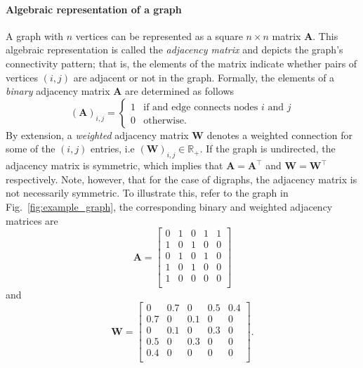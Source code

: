 \paragraph*{Algebraic representation of a graph}
A graph with $n$ vertices can be represented as a square $n\times n$ matrix $\bm{A}$. This algebraic representation is called the \emph{adjacency matrix} and depicts the graph's connectivity pattern; that is, the elements of the matrix indicate whether pairs of vertices $\left(i,j\right)$ are adjacent or not in the graph. Formally,
the elements of a \emph{binary} adjacency matrix $\bm{A}$ are determined as follows
\begin{equation}
	\left(\bm{A}\right)_{i,j} =
	\begin{cases}
		1 & \text{if and edge connects nodes $i$ and $j$}\\
		0 & \text{otherwise}.
	\end{cases}
\end{equation}
By extension, a \emph{weighted} adjacency matrix $\bm{W}$ denotes a weighted connection for some of the $\left(i,j\right)$ entries, i.e $\left(\bm{W}\right)_{i,j} \in \mathbb{R}_+$. If the graph is undirected, the adjacency matrix is symmetric, which implies that $\bm{A}=\bm{A}^\intercal$ and $\bm{W}=\bm{W}^\intercal$respectively. Note, however, that for the case of digraphs, the adjacency matrix is not necessarily symmetric. To illustrate this, refer to the graph in Fig.~\ref{fig:example_graph}, the corresponding binary and weighted adjacency matrices are
\begin{equation*}
	\bm{A} = \begin{bmatrix}
		0 & 1 & 0 & 1 & 1\\
		1 & 0 & 1 & 0 & 0\\
		0 & 1 & 0 & 1 & 0\\
		1 & 0 & 1 & 0 & 0\\
		1 & 0 & 0 & 0 & 0\\
	\end{bmatrix}
\end{equation*} 
and
\begin{equation*}
	\bm{W} = \begin{bmatrix}
		0 & 0.7 & 0 & 0.5 & 0.4\\
		0.7 & 0 & 0.1 & 0 & 0\\
		0 & 0.1 & 0 & 0.3 & 0\\
		0.5 & 0 & 0.3 & 0 & 0\\
		0.4 & 0 & 0 & 0 & 0\\
	\end{bmatrix}.
\end{equation*} 
